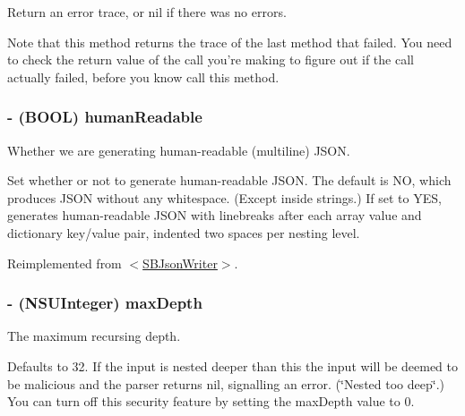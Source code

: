 \-Return an error trace, or nil if there was no errors. 

\-Note that this method returns the trace of the last method that failed. \-You need to check the return value of the call you're making to figure out if the call actually failed, before you know call this method. \hypertarget{interface_s_b_json_writer_a16ca84860a2ee76a03b567dc5181a851}{
\subsubsection[{human\-Readable}]{\setlength{\rightskip}{0pt plus 5cm}-\/ (\-B\-O\-O\-L) human\-Readable}}
\label{interface_s_b_json_writer_a16ca84860a2ee76a03b567dc5181a851}


\-Whether we are generating human-\/readable (multiline) \-J\-S\-O\-N. 

\-Set whether or not to generate human-\/readable \-J\-S\-O\-N. \-The default is \-N\-O, which produces \-J\-S\-O\-N without any whitespace. (\-Except inside strings.) \-If set to \-Y\-E\-S, generates human-\/readable \-J\-S\-O\-N with linebreaks after each array value and dictionary key/value pair, indented two spaces per nesting level. 

\-Reimplemented from \hyperlink{protocol_s_b_json_writer-p_a69f531597668b4b3c20aabee1e3d4558}{$<$\-S\-B\-Json\-Writer$>$}.

\hypertarget{interface_s_b_json_writer_a283b4f65ab4d3e1a8112b37dea432689}{
\subsubsection[{max\-Depth}]{\setlength{\rightskip}{0pt plus 5cm}-\/ (\-N\-S\-U\-Integer) max\-Depth}}
\label{interface_s_b_json_writer_a283b4f65ab4d3e1a8112b37dea432689}


\-The maximum recursing depth. 

\-Defaults to 32. \-If the input is nested deeper than this the input will be deemed to be malicious and the parser returns nil, signalling an error. (\char`\"{}\-Nested too deep\char`\"{}.) \-You can turn off this security feature by setting the max\-Depth value to 0. 

